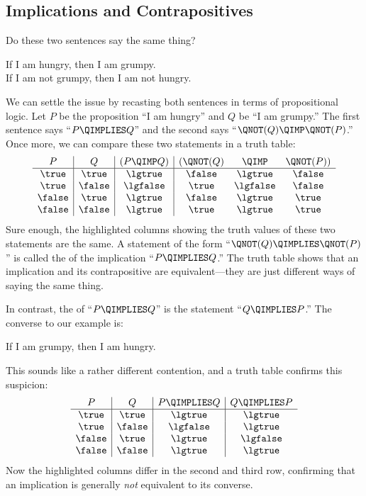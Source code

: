 \subsection{Implications and Contrapositives}\label{implication_sec}
Do these two sentences say the same thing?
%
\begin{center}
If I am hungry, then I am grumpy. \\
If I am not grumpy, then I am not hungry.
\end{center}
%
We can settle the issue by recasting both sentences in terms of
propositional logic.  Let $P$ be the proposition ``I am hungry'' and $Q$
be ``I am grumpy.''  The first sentence says ``$P \QIMPLIES Q$'' and the
second says ``$\QNOT(Q) \QIMP \QNOT(P)$.''  Once more, we can compare
these two statements in a truth table:
%
\[
\begin{array}{c|c|c|ccc}
   P   &   Q    & (P  \QIMP  Q) & (\QNOT(Q) & \QIMP & \QNOT(P)) \\ \hline
\true  & \true  &     \lgtrue   &  \false   & \lgtrue  &  \false\\
\true  & \false &     \lgfalse  &  \true    & \lgfalse &  \false\\
\false & \true  &     \lgtrue   &  \false   & \lgtrue  &  \true \\
\false & \false &     \lgtrue   &  \true    & \lgtrue  &  \true \\
\end{array}
\]
%
Sure enough, the highlighted columns showing the truth values of these two
statements are the same.  A statement of the form ``$\QNOT (Q) \QIMPLIES
\QNOT (P)$'' is called the  of the implication ``$P
\QIMPLIES Q$.''  The truth table shows that an implication and its
contrapositive are equivalent---they are just different ways of saying
the same thing.

In contrast, the  of ``$P \QIMPLIES Q$'' is the statement
``$Q \QIMPLIES P$.''  The converse to our example is:
%
\begin{center}
If I am grumpy, then I am hungry.
\end{center}
%
This sounds like a rather different contention, and a truth table
confirms this suspicion:
%
\[
\begin{array}{c|c|c|c}
P & Q &
    P \QIMPLIES Q &
    Q \QIMPLIES P \\ \hline
\true & \true & \lgtrue & \lgtrue \\
\true & \false & \lgfalse & \lgtrue \\
\false & \true & \lgtrue & \lgfalse \\
\false & \false & \lgtrue & \lgtrue
\end{array}
\]
%
Now the highlighted columns differ in the second and third row, confirming
that an implication is generally \textit{not} equivalent to its converse.

